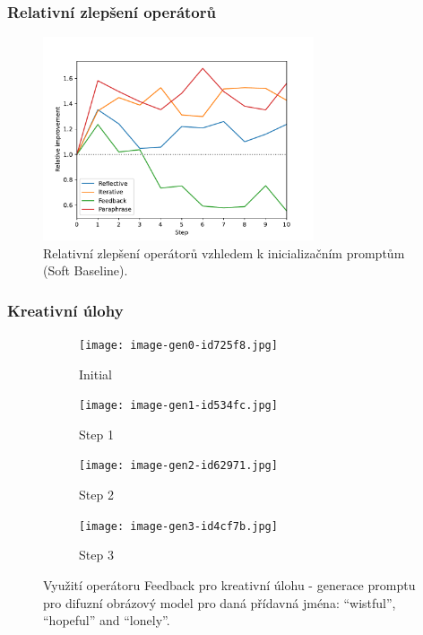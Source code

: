 \documentclass[aspectratio=169]{beamer}
\begin{document}
\begin{frame}
	\frametitle{Relativní zlepšení operátorů}
	\begin{figure}
		\includegraphics[width=8cm]{relative.pdf}
		\caption{Relativní zlepšení operátorů vzhledem k inicializačním promptům (Soft Baseline).}
	\end{figure}
\end{frame}

\begin{frame}
	\frametitle{Kreativní úlohy}
	\begin{figure}[htbp]
    \centering

    \begin{subfigure}{0.24\linewidth}
        \texttt{[image: image-gen0-id725f8.jpg]}
        \caption{Initial}
    \end{subfigure}
    \hfill
    \begin{subfigure}{0.24\linewidth}
        \texttt{[image: image-gen1-id534fc.jpg]}
        \caption{Step 1}
    \end{subfigure}
    \hfill
    \begin{subfigure}{0.24\linewidth}
        \texttt{[image: image-gen2-id62971.jpg]}
        \caption{Step 2}
    \end{subfigure}
    \hfill
    \begin{subfigure}{0.24\linewidth}
        \texttt{[image: image-gen3-id4cf7b.jpg]}
        \caption{Step 3}
    \end{subfigure}

    \caption{Využití operátoru Feedback pro kreativní úlohu - generace promptu pro difuzní obrázový model pro daná přídavná jména: ``wistful'', ``hopeful'' and ``lonely''.}
    \label{fig:wistful}
\end{figure}
\end{frame}
\end{document}

